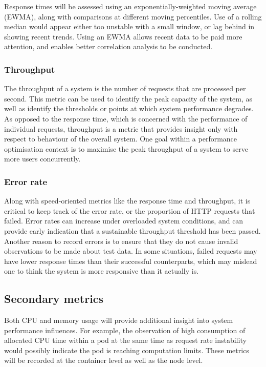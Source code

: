 Response times will be assessed using an exponentially-weighted moving average (EWMA), along with comparisons at different moving percentiles. Use of a rolling median would appear either too unstable with a small window, or lag behind in showing recent trends. Using an EWMA allows recent data to be paid more attention, and enables better correlation analysis to be conducted.

\subsubsection{Throughput}

The throughput of a system is the number of requests that are processed per second. This metric can be used to identify the peak capacity of the system, as well as identify the thresholds or points at which system performance degrades. As opposed to the response time, which is concerned with the performance of individual requests, throughput is a metric that provides insight only with respect to behaviour of the overall system. One goal within a performance optimisation context is to maximise the peak throughput of a system to serve more users concurrently.

\subsubsection{Error rate}

Along with speed-oriented metrics like the response time and throughput, it is critical to keep track of the error rate, or the proportion of HTTP requests that failed. Error rates can increase under overloaded system conditions, and can provide early indication that a sustainable throughput threshold has been passed. Another reason to record errors is to ensure that they do not cause invalid observations to be made about test data. In some situations, failed requests may have lower response times than their successful counterparts, which may mislead one to think the system is more responsive than it actually is.

\subsection{Secondary metrics}

Both CPU and memory usage will provide additional insight into system performance influences. For example, the observation of high consumption of allocated CPU time within a pod at the same time as request rate instability would possibly indicate the pod is reaching computation limits. These metrics will be recorded at the container level as well as the node level. 

